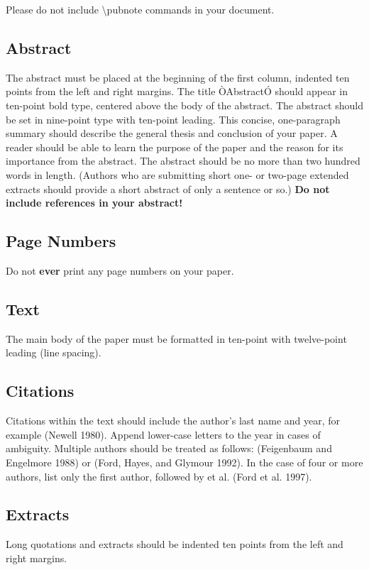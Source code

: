 \documentclass[letterpaper]{article}
\begin{document}
Please do not include \textbackslash pubnote commands in your document.

\subsection{Abstract}
The abstract must be placed at the beginning of the first column, indented ten points from the left and right margins. The title ÒAbstractÓ should appear in ten-point bold type, centered above the body of the abstract. The abstract should be set in nine-point type with ten-point leading. This concise, one-paragraph summary should describe the general thesis and conclusion of your paper. A reader should be able to learn the purpose of the paper and the reason for its importance from the abstract. The abstract should be no more than two hundred words in length. (Authors who are submitting short one- or two-page extended extracts should provide a short abstract of only a sentence or so.) \textbf{Do not include references in your abstract!}

\subsection{Page Numbers}

Do not \textbf{ever} print any page numbers on your paper. 

\subsection{Text }
The main body of the paper must be formatted in ten-point with twelve-point leading (line spacing).

\subsection{Citations}
Citations within the text should include the author's last name and year, for example (Newell 1980). Append lower-case letters to the year in cases of ambiguity. Multiple authors should be treated as follows: (Feigenbaum and Engelmore 1988) or (Ford, Hayes, and Glymour 1992). In the case of four or more authors, list only the first author, followed by et al. (Ford et al. 1997).

\subsection{Extracts}
Long quotations and extracts should be indented ten points from the left and right margins. 
\end{document}
